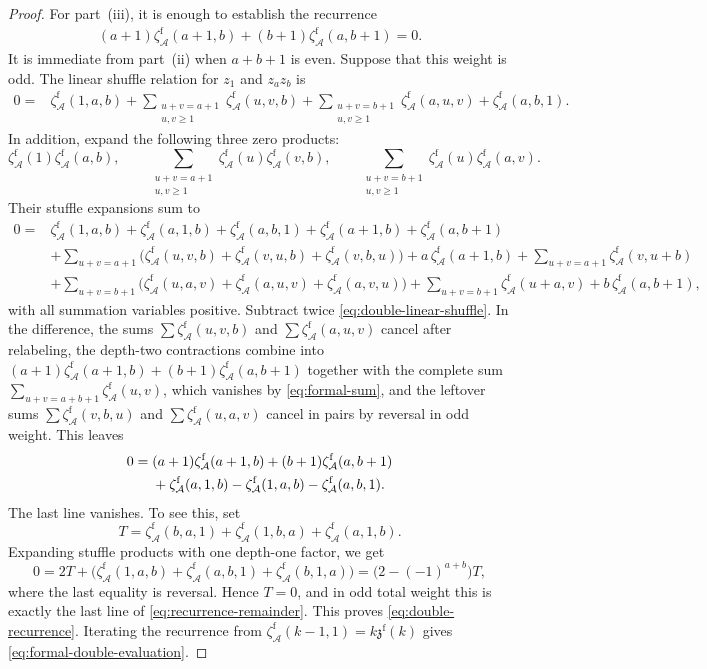 \documentclass[12pt]{amsart}
\numberwithin{equation}{section}
\theoremstyle{plain}
\newcommand{\zaf}[1]{\zeta_{\mathcal A}^{\mathrm f}(#1)}
\newcommand{\zzf}[1]{\mathfrak z^{\mathrm f}(#1)}
\begin{document}
\begin{proof}
For part~(iii), it is enough to establish the recurrence
\begin{align}\label{eq:double-recurrence}
 (a+1)\zaf{a+1,b}+(b+1)\zaf{a,b+1}=0.
\end{align}
It is immediate from part~(ii) when $a+b+1$ is even. Suppose that this weight is odd. The linear shuffle relation for $z_1$ and $z_az_b$ is
\begin{align}\label{eq:double-linear-shuffle}
0={}&\zaf{1,a,b}
+\sum_{\substack{u+v=a+1\\u,v\geq1}}\zaf{u,v,b}
+\sum_{\substack{u+v=b+1\\u,v\geq1}}\zaf{a,u,v}
+\zaf{a,b,1}.
\end{align}
In addition, expand the following three zero products:
\[
 \zaf{1}\zaf{a,b},\qquad
 \sum_{\substack{u+v=a+1\\u,v\geq1}}\zaf{u}\zaf{v,b},\qquad
 \sum_{\substack{u+v=b+1\\u,v\geq1}}\zaf{u}\zaf{a,v}.
\]
Their stuffle expansions sum to
\begin{align*}
 0={}&\zaf{1,a,b}+\zaf{a,1,b}+\zaf{a,b,1}
 +\zaf{a+1,b}+\zaf{a,b+1}\\
 &+\sum_{u+v=a+1}\bigl(\zaf{u,v,b}+\zaf{v,u,b}+\zaf{v,b,u}\bigr)
 +a\,\zaf{a+1,b}+\sum_{u+v=a+1}\zaf{v,u+b}\\
 &+\sum_{u+v=b+1}\bigl(\zaf{u,a,v}+\zaf{a,u,v}+\zaf{a,v,u}\bigr)
 +\sum_{u+v=b+1}\zaf{u+a,v}+b\,\zaf{a,b+1},
\end{align*}
with all summation variables positive. Subtract twice
\eqref{eq:double-linear-shuffle}. In the difference, the sums
$\sum\zaf{u,v,b}$ and $\sum\zaf{a,u,v}$ cancel after relabeling, the
depth-two contractions combine into
$(a+1)\zaf{a+1,b}+(b+1)\zaf{a,b+1}$ together with the complete sum
$\sum_{u+v=a+b+1}\zaf{u,v}$, which vanishes by \eqref{eq:formal-sum},
and the leftover sums $\sum\zaf{v,b,u}$ and $\sum\zaf{u,a,v}$ cancel in
pairs by reversal in odd weight. This leaves
\begin{align}\label{eq:recurrence-remainder}
 0={}&(a+1)\zaf{a+1,b}+(b+1)\zaf{a,b+1}\\
 &+\zaf{a,1,b}-\zaf{1,a,b}-\zaf{a,b,1}.\notag
\end{align}
The last line vanishes. To see this, set
\[
 T=\zaf{b,a,1}+\zaf{1,b,a}+\zaf{a,1,b}.
\]
Expanding stuffle products with one depth-one factor, we get
\[
 0=2T+\bigl(\zaf{1,a,b}+\zaf{a,b,1}+\zaf{b,1,a}\bigr)
   =\bigl(2-(-1)^{a+b}\bigr)T,
\]
where the last equality is reversal. Hence $T=0$, and in odd total weight this is exactly the last line of \eqref{eq:recurrence-remainder}. This proves \eqref{eq:double-recurrence}. Iterating the recurrence from $\zaf{k-1,1}=k\zzf{k}$ gives \eqref{eq:formal-double-evaluation}.
\end{proof}
\end{document}
